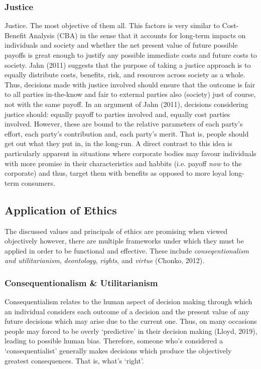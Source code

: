 \documentclass[11pt, english]{article}
\begin{document}
		\subsubsection{Justice}

	Justice. The most objective of them all. This factors is very similar to Cost-Benefit Analysis (CBA) in the sense that it accounts for long-term impacts on individuals and society and whether the net present value of future possible payoffs is great enough to justify any possible immediate costs and future costs to society. Jahn (2011) suggests that the purpose of taking a justice approach is to equally distribute costs, benefits, risk, and resources across society as a whole. Thus, decisions made with justice involved should ensure that the outcome is fair to all parties in-the-know and fair to external parties also (society) just of course, not with the same payoff. In an argument of Jahn (2011), decisions considering justice should: equally payoff to parties involved and, equally cost parties involved. However, these are bound to the relative parameters of each party's effort, each party's contribution and, each party's merit. That is, people should get out what they put in, in the long-run. A direct contrast to this idea is particularly apparent in situations where corporate bodies may favour individuals with more promise in their characteristics and habbits (i.e. payoff \textit{now} to the corporate) and thus, target them with benefits as opposed to more loyal long-term consumers.

	\subsection{Application of Ethics}

	The discussed values and principals of ethics are promising when viewed objectively however, there are multiple frameworks under which they must be applied in order to be functional and effective. These include \textit{conseqentionalism and utilitarianism}, \textit{deontology}, \textit{rights}, and \textit{virtue} (Chonko, 2012).

		\subsubsection{Consequentionalism \& Utilitarianism}

	Consequentialism relates to the human aspect of decision making through which an individual considers each outcome of a decision and the present value of any future decisions which may arise due to the current one. Thus, on many occasions people may forced to be overly `predictive' in their decision making (Lloyd, 2019), leading to possible human bias. Therefore, someone who's considered a `consequentialist' generally makes decisions which produce the objectively greatest consequences. That is, what's `right'.\\
\end{document}
